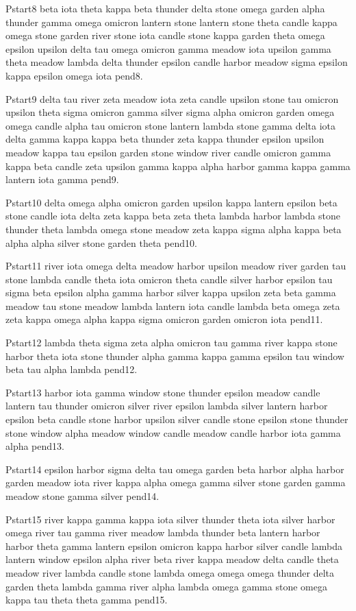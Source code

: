 \documentclass{article}
\begin{document}
Pstart8 beta iota theta kappa beta thunder delta stone omega garden alpha thunder gamma omega omicron lantern stone lantern stone theta candle kappa omega stone garden river stone iota candle stone kappa garden theta omega epsilon upsilon delta tau omega omicron gamma meadow iota upsilon gamma theta meadow lambda delta thunder epsilon candle harbor meadow sigma epsilon kappa epsilon omega iota pend8.

Pstart9 delta tau river zeta meadow iota zeta candle upsilon stone tau omicron upsilon theta sigma omicron gamma silver sigma alpha omicron garden omega omega candle alpha tau omicron stone lantern lambda stone gamma delta iota delta gamma kappa kappa beta thunder zeta kappa thunder epsilon upsilon meadow kappa tau epsilon garden stone window river candle omicron gamma kappa beta candle zeta upsilon gamma kappa alpha harbor gamma kappa gamma lantern iota gamma pend9.

Pstart10 delta omega alpha omicron garden upsilon kappa lantern epsilon beta stone candle iota delta zeta kappa beta zeta theta lambda harbor lambda stone thunder theta lambda omega stone meadow zeta kappa sigma alpha kappa beta alpha alpha silver stone garden theta pend10.

Pstart11 river iota omega delta meadow harbor upsilon meadow river garden tau stone lambda candle theta iota omicron theta candle silver harbor epsilon tau sigma beta epsilon alpha gamma harbor silver kappa upsilon zeta beta gamma meadow tau stone meadow lambda lantern iota candle lambda beta omega zeta zeta kappa omega alpha kappa sigma omicron garden omicron iota pend11.

Pstart12 lambda theta sigma zeta alpha omicron tau gamma river kappa stone harbor theta iota stone thunder alpha gamma kappa gamma epsilon tau window beta tau alpha lambda pend12.

Pstart13 harbor iota gamma window stone thunder epsilon meadow candle lantern tau thunder omicron silver river epsilon lambda silver lantern harbor epsilon beta candle stone harbor upsilon silver candle stone epsilon stone thunder stone window alpha meadow window candle meadow candle harbor iota gamma alpha pend13.

Pstart14 epsilon harbor sigma delta tau omega garden beta harbor alpha harbor garden meadow iota river kappa alpha omega gamma silver stone garden gamma meadow stone gamma silver pend14.

Pstart15 river kappa gamma kappa iota silver thunder theta iota silver harbor omega river tau gamma river meadow lambda thunder beta lantern harbor harbor theta gamma lantern epsilon omicron kappa harbor silver candle lambda lantern window epsilon alpha river beta river kappa meadow delta candle theta meadow river lambda candle stone lambda omega omega omega thunder delta garden theta lambda gamma river alpha lambda omega gamma stone omega kappa tau theta theta gamma pend15.
\end{document}
